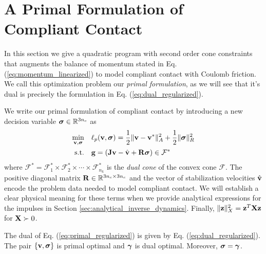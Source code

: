 
\section{A Primal Formulation of Compliant Contact}
In this section we give a quadratic program with second order cone constraints
that augments the balance of momentum stated in Eq.
(\ref{eq:momentum_linearized}) to model compliant contact with Coulomb friction.
We call this optimization problem our \emph{primal formulation}, as we will see
that it's dual is precisely the formulation in Eq. (\ref{eq:dual_regularized}).

We write our primal formulation of compliant contact by introducing a new
decision variable ${\bm{\sigma}}\in\mathbb{R}^{3n_c}$ as
\begin{equation}
	\begin{aligned}
	\min_{\mf{v},\bsigma} \quad & \ell_p(\mf{v},\bsigma) = 
	\frac{1}{2}\Vert\mf{v}-\mf{v}^*\Vert_A^2 + \frac{1}{2} \Vert\bsigma\Vert_{R}^2\\
	\textrm{s.t.} \quad & \mf{g} = (\mf{J}\mf{v}-\hat{\mf{v}} + \mf{R}\bsigma) \in \mathcal{F}^*\\
	\end{aligned}
	\label{eq:primal_regularized}
\end{equation}
where $\mathcal{F^*}= \mathcal{F}^*_1 \times \mathcal{F}^*_2 \times \cdots
\times \mathcal{F}^*_{n_k}$ is the \emph{dual cone} of the convex cone
$\mathcal{F}$. The positive diagonal matrix ${\mathbf{R}}\in\mathbb{R}^{3n_c\times
3n_c}$ and the vector of stabilization velocities $\hat{{\mathbf{v}}}$ encode the
problem data needed to model compliant contact. We will establish a clear
physical meaning for these terms when we provide analytical expressions for the
impulses in Section \ref{sec:analytical_inverse_dynamics}. Finally,
$\Vert{\mathbf{z}}\Vert_X^2={\mathbf{z}}^T{\mathbf{X}}{\mathbf{z}}$ for ${\mathbf{X}}\succ 0$.

\begin{theorem}
The dual of Eq. (\ref{eq:primal_regularized}) is given by Eq.
(\ref{eq:dual_regularized}). The pair $\{{\mathbf{v}},{\bm\sigma}\}$ is primal optimal and
${\bm\gamma}$ is dual optimal. Moreover, ${\bm\sigma} = {\bm\gamma}$.
\end{theorem}

